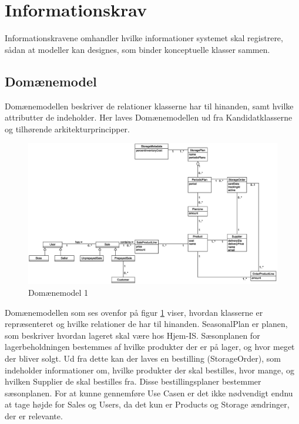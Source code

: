\section{Informationskrav}\label{sec:informations-krav}
Informationskravene omhandler hvilke informationer systemet skal registrere, sådan at modeller 
kan designes, som binder konceptuelle klasser sammen.

\subsection{Domænemodel}\label{Domainmodel}
Domænemodellen\cite{Larman2004} beskriver de relationer klasserne har til hinanden, samt hvilke attributter de indeholder. Her laves Domænemodellen ud fra Kandidatklasserne og tilhørende arkitekturprincipper.

\begin{landscape}
\begin{figure}[p]
    \centering
    \includegraphics[width=0.9\hsize]{figures/krav/domain_model_1.eps}
    \caption{Domænemodel 1}
    \label{fig:domain_model}
\end{figure}
\end{landscape}

Domænemodellen som ses ovenfor på figur \ref{fig:domain_model} viser, hvordan klasserne er repræsenteret og hvilke relationer de har til hinanden. SeasonalPlan er planen, som beskriver hvordan lageret skal være hos Hjem-IS. Sæsonplanen for lagerbeholdningen bestemmes af hvilke produkter der er på lager, og hvor meget der bliver solgt. Ud fra dette kan der laves en bestilling (StorageOrder), som indeholder informationer om, hvilke produkter der skal bestilles, hvor mange, og hvilken Supplier de skal bestilles fra. Disse bestillingsplaner bestemmer sæsonplanen.
For at kunne gennemføre Use Casen er det ikke nødvendigt endnu at tage højde for Sales og Users, da det kun er Products og Storage ændringer, der er relevante. 

